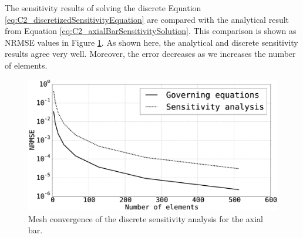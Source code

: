 The sensitivity results of solving the discrete Equation \eqref{eq:C2_discretizedSensitivityEquation} are compared with the analytical result from Equation \eqref{eq:C2_axialBarSensitivitySolution}. This comparison is shown as NRMSE values in Figure \ref{fig:C2_barDiscreteSensitivityAnalysis}. As shown here, the analytical and discrete sensitivity results agree very well. Moreover, the error decreases as we increases the number of elements.

\begin{figure}[h]
	\centering
	\includegraphics[width=14.00cm]{Chapter_2/figure/axial_bar_discrete_sensitivity_analysis.eps}
	\caption{Mesh convergence of the discrete sensitivity analysis for the axial bar.}
	\label{fig:C2_barDiscreteSensitivityAnalysis}
\end{figure}
